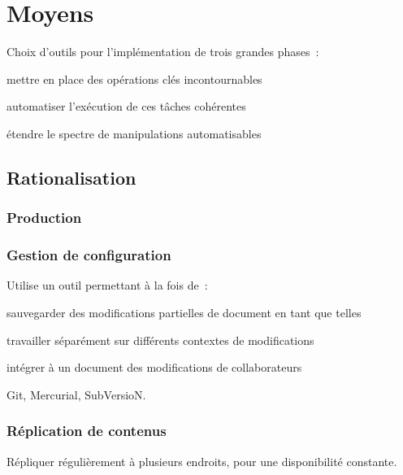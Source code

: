 \section{Moyens}



Choix d’outils pour l’implémentation de trois grandes phases :

\begin{itmz}
\item{mettre en place des opérations clés incontournables}
\item{automatiser l’exécution de ces tâches cohérentes}
\item{étendre le spectre de manipulations automatisables}
\end{itmz}

\hr

\subsection{Rationalisation}

\subsubsection{Production}

\subsubsection{Gestion de configuration}

Utilise un outil permettant à la fois de :
\begin{itmz}
\item{sauvegarder des modifications partielles de document en tant que telles}
\item{travailler séparément sur différents contextes de modifications}
\item{intégrer à un document des modifications de collaborateurs}
\end{itmz}

Git, Mercurial, SubVersioN.

\subsubsection{Réplication de contenus}

Répliquer régulièrement à plusieurs endroits, pour une disponibilité constante.

